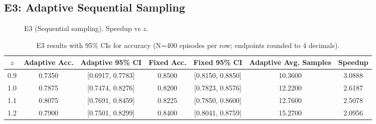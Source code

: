 \subsection{E3: Adaptive Sequential Sampling}
\begin{figure}[H]
  \centering
  \begin{adjustbox}{width=\linewidth}
  \end{adjustbox}
  \caption{E3 (Sequential sampling). Speedup vs $z$.}
  \label{fig:e3}
\end{figure}

\begin{table}[H]
  \centering
  \caption{E3 results with 95\% CIs for accuracy (N=400 episodes per row; endpoints rounded to 4 decimals).}
  \vspace{0.25em}
  \begin{adjustbox}{width=\linewidth}
  \begin{tabular}{c c c c c c c}
    \toprule
    $z$ & Adaptive Acc. & Adaptive 95\% CI & Fixed Acc. & Fixed 95\% CI & Adaptive Avg. Samples & Speedup \\
    \midrule
    0.9 & 0.7350 & [0.6917, 0.7783] & 0.8500 & [0.8150, 0.8850] & 10.3600 & 3.0888 \\
    1.0 & 0.7875 & [0.7474, 0.8276] & 0.8200 & [0.7823, 0.8576] & 12.2200 & 2.6187 \\
    1.1 & 0.8075 & [0.7691, 0.8459] & 0.8225 & [0.7850, 0.8600] & 12.7600 & 2.5078 \\
    1.2 & 0.7900 & [0.7501, 0.8299] & 0.8400 & [0.8041, 0.8759] & 15.2700 & 2.0956 \\
    \bottomrule
  \end{tabular}
  \end{adjustbox}
\end{table}

